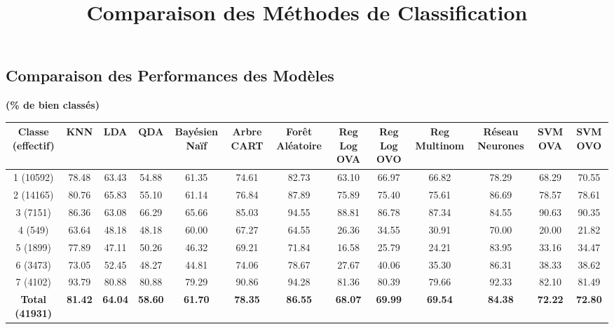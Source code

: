 \documentclass[
]{article}
\title{Comparaison des Méthodes de Classification}
\author{}
\date{}
\renewcommand{\arraystretch}{1.2} %
\begin{document}
\maketitle


\subsection{Comparaison des Performances des
Modèles}\label{comparaison-des-performances-des-moduxe8les}

\textbf{(\% de bien classés)}

\begingroup
\renewcommand{\arraystretch}{2}
\Large
\begin{adjustbox}{max width=\textwidth}
\begin{tabular}{|c|c|c|c|c|c|c|c|c|c|c|c|c|}
\hline
\textbf{Classe (effectif)} & \textbf{KNN} & \textbf{LDA} & \textbf{QDA} & \textbf{Bayésien Naïf} & \textbf{Arbre CART} & \textbf{Forêt Aléatoire} & \textbf{Reg Log OVA} & \textbf{Reg Log OVO} & \textbf{Reg Multinom} & \textbf{Réseau Neurones} & \textbf{SVM OVA} & \textbf{SVM OVO} \\
\hline
1 (10592) & 78.48 & 63.43 & 54.88 & 61.35 & 74.61 & 82.73 & 63.10 & 66.97 & 66.82 & 78.29 & 68.29 & 70.55 \\
2 (14165) & 80.76 & 65.83 & 55.10 & 61.14 & 76.84 & 87.89 & 75.89 & 75.40 & 75.61 & 86.69 & 78.57 & 78.61 \\
3 (7151) & 86.36 & 63.08 & 66.29 & 65.66 & 85.03 & 94.55 & 88.81 & 86.78 & 87.34 & 84.55 & 90.63 & 90.35 \\
4 (549) & 63.64 & 48.18 & 48.18 & 60.00 & 67.27 & 64.55 & 26.36 & 34.55 & 30.91 & 70.00 & 20.00 & 21.82 \\
5 (1899) & 77.89 & 47.11 & 50.26 & 46.32 & 69.21 & 71.84 & 16.58 & 25.79 & 24.21 & 83.95 & 33.16 & 34.47 \\
6 (3473) & 73.05 & 52.45 & 48.27 & 44.81 & 74.06 & 78.67 & 27.67 & 40.06 & 35.30 & 86.31 & 38.33 & 38.62 \\
7 (4102) & 93.79 & 80.88 & 80.88 & 79.29 & 90.86 & 94.28 & 81.36 & 80.39 & 79.66 & 92.33 & 82.10 & 81.49 \\
\hline
\textbf{Total (41931)} & \textbf{81.42} & \textbf{64.04} & \textbf{58.60} & \textbf{61.70} & \textbf{78.35} & \textbf{86.55} & \textbf{68.07} & \textbf{69.99} & \textbf{69.54} & \textbf{84.38} & \textbf{72.22} & \textbf{72.80} \\
\hline
\end{tabular}
\end{adjustbox}
\endgroup
\end{document}

